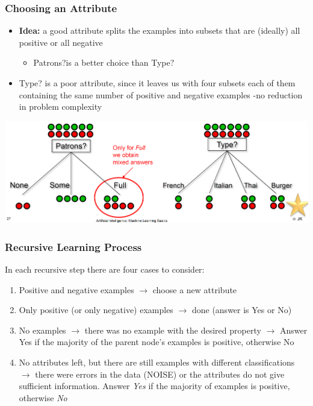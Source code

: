 \documentclass[conference]{styles/acmsiggraph}
\begin{document}
        \subsubsection{Choosing an Attribute}
            \begin{itemize}
                \item \textbf{Idea:} a good attribute splits the examples into subsets that are (ideally) all positive or all negative
                \begin{itemize}
                    \item Patrons?is a better choice than Type?
                \end{itemize}
                \item Type? is a poor attribute, since it leaves us with four subsets each of them containing the same number of positive and negative examples -no reduction in problem complexity
            \end{itemize}
            \includegraphics[width=1\textwidth]{imgs/ChoosingAnAttribute.png}\newline

\newpage

        \subsubsection{Recursive Learning Process}
            In each recursive step there are four cases to consider:
            \begin{enumerate}
                \item Positive and negative examples\newline
                $\rightarrow$ choose a new attribute
                \item Only positive (or only negative) examples\newline
                $\rightarrow$ done (answer is Yes or No)
                \item No examples\newline
                $\rightarrow$ there was no example with the desired property\newline 
                $\rightarrow$ Answer Yes if the majority of the parent node's examples is positive, otherwise No
                \item No attributes left, but there are still examples with different classifications\newline
                $\rightarrow$ there were errors in the data (NOISE) or the attributes do not give sufficient information. Answer \textit{Yes} if the majority of examples is positive, otherwise \textit{No}
            \end{enumerate}
        
\end{document}
